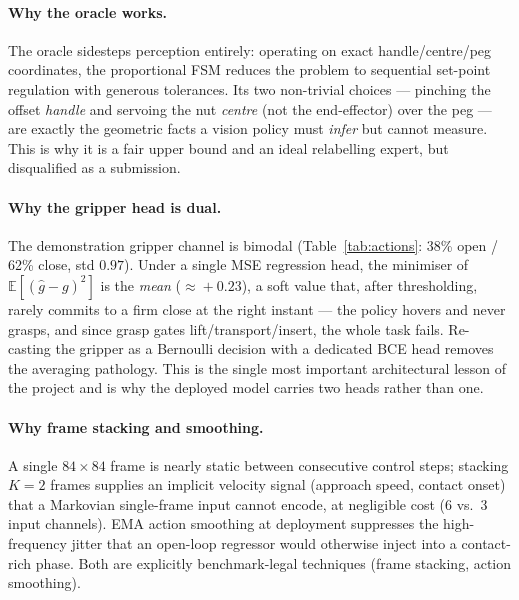 \documentclass[10pt]{article}
\begin{document}
\paragraph{Why the oracle works.} The oracle sidesteps perception entirely:
operating on exact handle/centre/peg coordinates, the proportional FSM reduces the
problem to sequential set-point regulation with generous tolerances. Its two
non-trivial choices --- pinching the offset \emph{handle} and servoing the nut
\emph{centre} (not the end-effector) over the peg --- are exactly the geometric
facts a vision policy must \emph{infer} but cannot measure. This is why it is a
fair upper bound and an ideal relabelling expert, but disqualified as a submission.

\paragraph{Why the gripper head is dual.} The demonstration gripper channel is
bimodal (Table~\ref{tab:actions}: 38\% open / 62\% close, std $0.97$). Under a
single MSE regression head, the minimiser of $\mathbb{E}[(\hat g - g)^2]$ is the
\emph{mean} ($\approx\!+0.23$), a soft value that, after thresholding, rarely
commits to a firm close at the right instant --- the policy hovers and never grasps,
and since grasp gates lift/transport/insert, the whole task fails. Re-casting the
gripper as a Bernoulli decision with a dedicated BCE head removes the averaging
pathology. This is the single most important architectural lesson of the project
and is why the deployed model carries two heads rather than one.

\paragraph{Why frame stacking and smoothing.} A single $84{\times}84$ frame is
nearly static between consecutive control steps; stacking $K{=}2$ frames supplies an
implicit velocity signal (approach speed, contact onset) that a Markovian
single-frame input cannot encode, at negligible cost (6 vs.\ 3 input channels).
EMA action smoothing at deployment suppresses the high-frequency jitter that an
open-loop regressor would otherwise inject into a contact-rich phase. Both are
explicitly benchmark-legal techniques (frame stacking, action smoothing).
\end{document}
